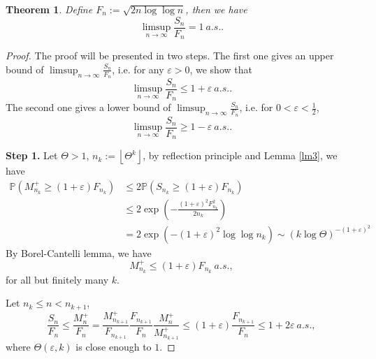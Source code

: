 \documentclass[11pt]{article}
\newtheorem{theorem}{Theorem}[section]
\theoremstyle{definition}
\newcommand{\floor}[1]{\left\lfloor #1 \right\rfloor}
\begin{document}
\begin{theorem}
  Define $F_n:={\sqrt{2n\log\log n}}$, then we have
\[
\limsup_{n\rightarrow \infty}  \frac{S_n}{F_n}=1\ a.s..
\]
\end{theorem}
\begin{proof}
  The proof will be presented in two steps. The first one gives an upper bound of $\limsup_{n\rightarrow \infty} \frac{S_n}{F_n}$, i.e. for any $\varepsilon>0$, we show that $$\limsup_{n\rightarrow \infty} \frac{S_n}{F_n}\le 1+\varepsilon\ a.s..$$
The second one gives a lower bound of $\limsup_{n\rightarrow \infty}\frac{S_n}{F_n}$, i.e. for $0<\varepsilon<\frac{1}{2}$, $$\limsup_{n\rightarrow \infty}\frac{S_n}{F_n}\ge 1-\varepsilon\ a.s..$$




{\bf Step 1.} Let $\Theta>1$, $n_k:=\floor{\Theta^k}$, by reflection principle and Lemma \ref{lm3}, we have
\begin{equation*}
  \begin{aligned}
    \mathbb{P}\left( M^+_{n_k} \ge (1+\varepsilon)F_{n_k}\right)  &\le 2\mathbb{P}\left( S_{n_k}\ge   (1+\varepsilon)F_{n_k}\right)\\ 
&\le 2\exp\left( -\frac{(1+\varepsilon)^2F^2_{n_k}}{2n_k} \right)\\ 
&=2\exp\left( -(1+\varepsilon)^2\log\log n_k \right)\sim(k\log \Theta)^{-(1+\varepsilon)^2}
  \end{aligned}
\end{equation*}
By Borel-Cantelli lemma, we have
\[
M^+_{n_k}\le (1+\varepsilon)F_{n_k} \ a.s.,
\]
for all but finitely many $k$.

Let $n_k\le n<n_{k+1}$,  
\[
\frac{S_n}{F_n}\le\frac{M^+_n}{F_n}=\frac{M^+_{n_{k+1}}}{F_{n_{k+1}}}\frac{F_{n_{k+1}}}{F_{n}}\frac{M^+_n}{M^+_{n_{k+1}}}\le (1+\varepsilon)\frac{F_{n_{k+1}}}{F_{n}} \le 1+2\varepsilon\ a.s.,
\]
where $\Theta(\varepsilon,k)$ is close enough to $1$.


\end{proof}
\end{document}
